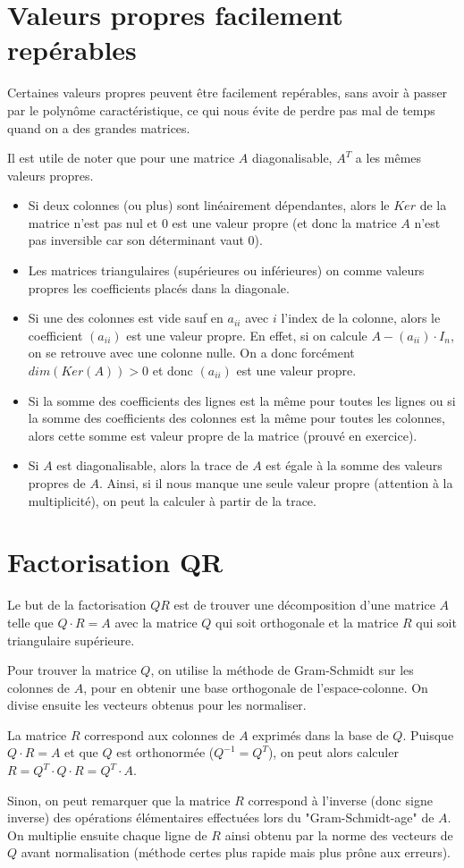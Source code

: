 \documentclass[10pt,a4paper]{book}
\begin{document}
\section{Valeurs propres facilement repérables}
Certaines valeurs propres peuvent être facilement repérables, sans avoir à passer par le polynôme caractéristique, ce qui nous évite de perdre pas mal de temps quand on a des grandes matrices. \par 
Il est utile de noter que pour une matrice $A$ diagonalisable, $A^T$ a les mêmes valeurs propres.
\begin{itemize}
\item Si deux colonnes (ou plus) sont linéairement dépendantes, alors le $Ker$ de la matrice n'est pas nul et 0 est une valeur propre (et donc la matrice $A$ n'est pas inversible car son déterminant vaut 0). 
\item Les matrices triangulaires (supérieures ou inférieures) on comme valeurs propres les coefficients placés dans la diagonale.
\item Si une des colonnes est vide sauf en $a_{ii}$ avec $i$ l'index de la colonne, alors le coefficient $(a_{ii})$ est une valeur propre. En effet, si on calcule $A-(a_{ii})\cdot I_n$, on se retrouve avec une colonne nulle. On a donc forcément $dim(Ker(A)) > 0$ et donc $(a_{ii})$ est une valeur propre. 
\item Si la somme des coefficients des lignes est la même pour toutes les lignes ou si la somme des coefficients des colonnes est la même pour toutes les colonnes, alors cette somme est valeur propre de la matrice (prouvé en exercice).
\item Si $A$ est diagonalisable, alors la trace de $A$ est égale à la somme des valeurs propres de $A$. Ainsi, si il nous manque une seule valeur propre (attention à la multiplicité), on peut la calculer à partir de la trace.
\end{itemize}

\section{Factorisation QR}
Le but de la factorisation $QR$ est de trouver une décomposition d'une matrice $A$ telle que $Q\cdot R=A$ avec la matrice $Q$ qui soit orthogonale et la matrice $R$ qui soit triangulaire supérieure.\par 
Pour trouver la matrice $Q$, on utilise la méthode de Gram-Schmidt sur les colonnes de $A$, pour en obtenir une base orthogonale de l'espace-colonne. On divise ensuite les vecteurs obtenus pour les normaliser.\par 
La matrice $R$ correspond aux colonnes de $A$ exprimés dans la base de $Q$. Puisque $Q\cdot R=A$ et que $Q$ est orthonormée ($Q^{-1}=Q^T$), on peut alors calculer $R=Q^T\cdot Q\cdot R=Q^T\cdot A$. \par
Sinon, on peut remarquer que la matrice $R$ correspond à l'inverse (donc signe inverse) des opérations élémentaires effectuées lors du "Gram-Schmidt-age" de $A$. On multiplie ensuite chaque ligne de $R$ ainsi obtenu par la norme des vecteurs de $Q$ avant normalisation (méthode certes plus rapide mais plus prône aux erreurs).
\end{document}
